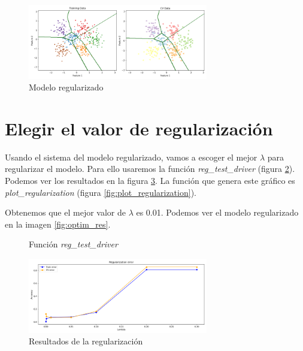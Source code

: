 \documentclass[6pt]{../../shared/AiTex}
\begin{document}
\begin{figure}[H]
    \centering
    \includegraphics[width=0.7\textwidth]{./images/decision_boundary_regularized.png}
    \caption{Modelo regularizado}
    \label{fig:regularized_results}
\end{figure}



\section{Elegir el valor de regularización}

Usando el sistema del modelo regularizado, vamos a escoger el mejor $\lambda$ para regularizar el modelo. Para ello usaremos la función \textit{reg\_test\_driver} (figura \ref{fig:reg_test_driver}). Podemos ver los resultados en la figura \ref{fig:lambda_results}. La función que genera este gráfico es \textit{plot\_regularization} (figura \ref{fig:plot_regularization}).

Obtenemos que el mejor valor de $\lambda$ es 0.01. Podemos ver el modelo regularizado en la imagen \ref{fig:optim_res}.

\begin{figure}[H]
    \centering
    
    \caption{Función \textit{reg\_test\_driver}}
    \label{fig:reg_test_driver}
\end{figure}

\begin{figure}[H]
    \centering
    \includegraphics[width=0.7\textwidth]{./images/tuning.png}
    \caption{Resultados de la regularización}
    \label{fig:lambda_results}
\end{figure}
\end{document}
